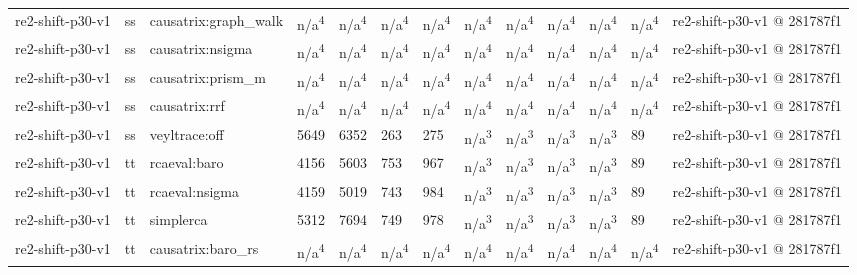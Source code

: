 \begin{table}[t]
\begin{tabular}{lllllllllllll}
re2-shift-p30-v1 & ss & causatrix:graph\_walk & n/a\textsuperscript{4} & n/a\textsuperscript{4} & n/a\textsuperscript{4} & n/a\textsuperscript{4} & n/a\textsuperscript{4} & n/a\textsuperscript{4} & n/a\textsuperscript{4} & n/a\textsuperscript{4} & n/a\textsuperscript{4} & re2-shift-p30-v1 @ 281787f1 \\
re2-shift-p30-v1 & ss & causatrix:nsigma & n/a\textsuperscript{4} & n/a\textsuperscript{4} & n/a\textsuperscript{4} & n/a\textsuperscript{4} & n/a\textsuperscript{4} & n/a\textsuperscript{4} & n/a\textsuperscript{4} & n/a\textsuperscript{4} & n/a\textsuperscript{4} & re2-shift-p30-v1 @ 281787f1 \\
re2-shift-p30-v1 & ss & causatrix:prism\_m & n/a\textsuperscript{4} & n/a\textsuperscript{4} & n/a\textsuperscript{4} & n/a\textsuperscript{4} & n/a\textsuperscript{4} & n/a\textsuperscript{4} & n/a\textsuperscript{4} & n/a\textsuperscript{4} & n/a\textsuperscript{4} & re2-shift-p30-v1 @ 281787f1 \\
re2-shift-p30-v1 & ss & causatrix:rrf & n/a\textsuperscript{4} & n/a\textsuperscript{4} & n/a\textsuperscript{4} & n/a\textsuperscript{4} & n/a\textsuperscript{4} & n/a\textsuperscript{4} & n/a\textsuperscript{4} & n/a\textsuperscript{4} & n/a\textsuperscript{4} & re2-shift-p30-v1 @ 281787f1 \\
re2-shift-p30-v1 & ss & veyltrace:off & 5649 & 6352 & 263 & 275 & n/a\textsuperscript{3} & n/a\textsuperscript{3} & n/a\textsuperscript{3} & n/a\textsuperscript{3} & 89 & re2-shift-p30-v1 @ 281787f1 \\
re2-shift-p30-v1 & tt & rcaeval:baro & 4156 & 5603 & 753 & 967 & n/a\textsuperscript{3} & n/a\textsuperscript{3} & n/a\textsuperscript{3} & n/a\textsuperscript{3} & 89 & re2-shift-p30-v1 @ 281787f1 \\
re2-shift-p30-v1 & tt & rcaeval:nsigma & 4159 & 5019 & 743 & 984 & n/a\textsuperscript{3} & n/a\textsuperscript{3} & n/a\textsuperscript{3} & n/a\textsuperscript{3} & 89 & re2-shift-p30-v1 @ 281787f1 \\
re2-shift-p30-v1 & tt & simplerca & 5312 & 7694 & 749 & 978 & n/a\textsuperscript{3} & n/a\textsuperscript{3} & n/a\textsuperscript{3} & n/a\textsuperscript{3} & 89 & re2-shift-p30-v1 @ 281787f1 \\
re2-shift-p30-v1 & tt & causatrix:baro\_rs & n/a\textsuperscript{4} & n/a\textsuperscript{4} & n/a\textsuperscript{4} & n/a\textsuperscript{4} & n/a\textsuperscript{4} & n/a\textsuperscript{4} & n/a\textsuperscript{4} & n/a\textsuperscript{4} & n/a\textsuperscript{4} & re2-shift-p30-v1 @ 281787f1 \\

\end{tabular}
\end{table}
